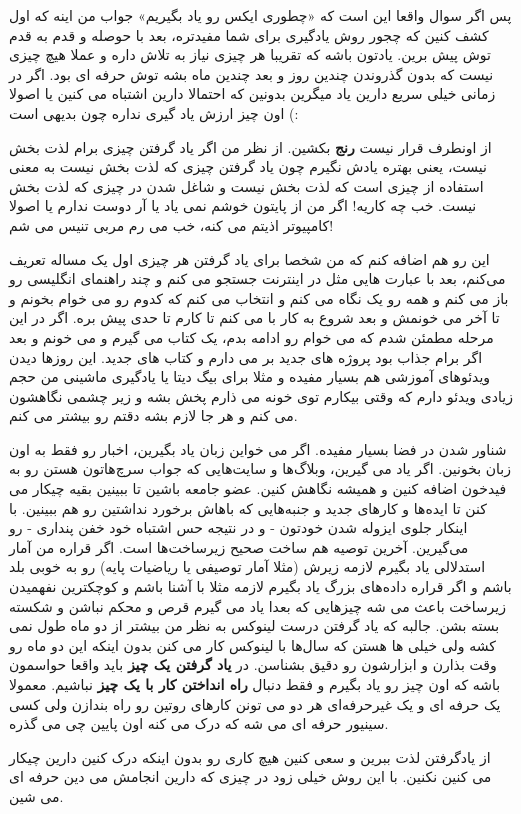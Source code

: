پس اگر سوال واقعا این است که «چطوری ایکس رو یاد بگیریم» جواب من اینه که اول کشف کنین که چجور روش یادگیری برای شما مفیدتره، بعد با حوصله و قدم به قدم توش پیش برین. یادتون باشه که تقریبا هر چیزی نیاز به تلاش داره و عملا هیچ چیزی نیست که بدون گذروندن چندین روز و بعد چندین ماه بشه توش حرفه ای بود. اگر در زمانی خیلی سریع دارین یاد میگرین بدونین که احتمالا دارین اشتباه می کنین یا اصولا اون چیز ارزش یاد گیری نداره چون بدیهی است (:

از اونطرف قرار نیست
\textbf{رنج}
بکشین. از نظر من اگر یاد گرفتن چیزی برام لذت بخش نیست، یعنی بهتره یادش نگیرم چون یاد گرفتن چیزی که لذت بخش نیست به معنی استفاده از چیزی است که لذت بخش نیست و شاغل شدن در چیزی که لذت بخش نیست. خب چه کاریه! اگر من از پایتون خوشم نمی یاد یا آر دوست ندارم یا اصولا کامپیوتر اذیتم می کنه،‌ خب می رم مربی تنیس می شم!

این رو هم اضافه کنم که من شخصا برای یاد گرفتن هر چیزی اول یک مساله تعریف می‌کنم، بعد با عبارت هایی مثل  در اینترنت جستجو می کنم و چند راهنمای انگلیسی رو باز می کنم و همه رو یک نگاه می کنم و انتخاب می کنم که کدوم رو می خوام بخونم و تا آخر می خونمش و بعد شروع به کار با  می کنم تا کارم تا حدی پیش بره. اگر در این مرحله مطمئن شدم که می خوام  رو ادامه بدم، یک کتاب می گیرم و می خونم و بعد اگر برام جذاب بود پروژه های جدید بر می دارم و کتاب های جدید. این روزها دیدن ویدئوهای آموزشی هم بسیار مفیده و مثلا برای بیگ دیتا یا یادگیری ماشینی من حجم زیادی ویدئو دارم که وقتی بیکارم توی خونه می ذارم پخش بشه و زیر چشمی نگاهشون می کنم و هر جا لازم بشه دقتم رو بیشتر می کنم.

شناور شدن در فضا بسیار مفیده. اگر می خواین زبان یاد بگیرین، اخبار رو فقط به اون زبان بخونین. اگر  یاد می گیرین، وبلاگ‌ها و سایت‌هایی که جواب سرچ‌هاتون هستن رو به فیدخون اضافه کنین و همیشه نگاهش کنین. عضو جامعه باشین تا ببینین بقیه چیکار می کنن تا ایده‌ها و کارهای جدید و جنبه‌هایی که باهاش برخورد نداشتین رو هم ببینین. با اینکار جلوی ایزوله شدن خودتون - و در نتیجه حس اشتباه خود خفن پنداری - رو می‌گیرین.
آخرین توصیه هم ساخت صحیح زیرساخت‌ها است. اگر قراره من آمار استدلالی یاد بگیرم لازمه زیرش (مثلا آمار توصیفی یا ریاضیات پایه)‌ رو به خوبی بلد باشم و اگر قراره داده‌های بزرگ یاد بگیرم لازمه مثلا با  آشنا باشم و کوچکترین نفهمیدن زیرساخت باعث می شه چیزهایی که بعدا یاد می گیرم قرص و محکم نباشن و شکسته بسته بشن. جالبه که یاد گرفتن درست لینوکس به نظر من بیشتر از دو ماه طول نمی کشه ولی خیلی ها هستن که سال‌ها با لینوکس کار می کنن بدون اینکه این دو ماه رو وقت بذارن و ابزارشون رو دقیق بشناسن. در
\textbf{یاد گرفتن یک چیز}
باید واقعا حواسمون باشه که اون چیز رو یاد بگیرم و فقط دنبال
\textbf{راه انداختن کار با یک چیز}
نباشیم. معمولا یک حرفه ای و یک غیرحرفه‌ای هر دو می تونن کارهای روتین رو راه بندازن ولی کسی سینیور \lr{/} حرفه ای می شه که درک می کنه اون پایین چی می گذره.

از یادگرفتن لذت ببرین و سعی کنین هیچ کاری رو بدون اینکه درک کنین دارین چیکار می کنین نکنین. با این روش خیلی زود در چیزی که دارین انجامش می دین حرفه ای می شین.
